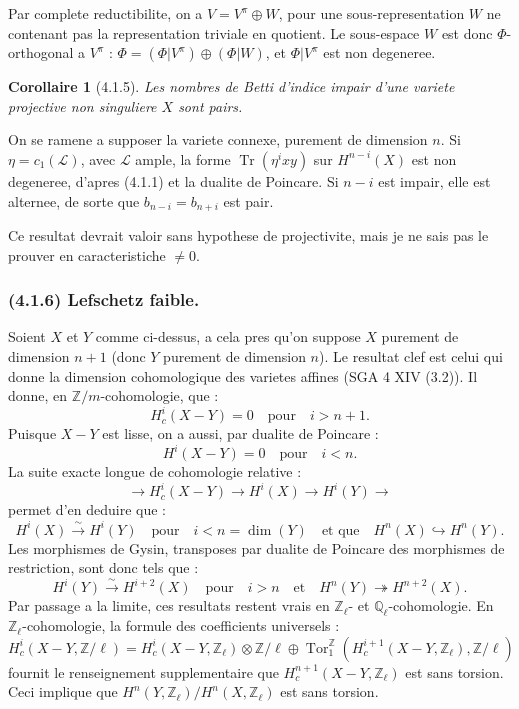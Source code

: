 \documentclass[12pt,a4paper]{article}
\theoremstyle{plain}
\newtheorem{corollary}[theorem]{Corollaire}
\theoremstyle{definition}
\theoremstyle{remark}
\DeclareMathOperator{\Tor}{Tor}
\DeclareMathOperator{\Tr}{Tr}
\newcommand{\bbZ}{\mathbb{Z}}
\newcommand{\scrL}{\mathscr{L}}
\newcommand{\Zl}{\mathbb{Z}_\ell}
\newcommand{\Ql}{\mathbb{Q}_\ell}
\begin{document}
Par complete reductibilite, on a $V = V^\pi \oplus W$, pour une sous-representation $W$ ne contenant pas la representation triviale en quotient. Le sous-espace $W$ est donc $\Phi$-orthogonal a $V^\pi$ : $\Phi = (\Phi|V^\pi) \oplus (\Phi|W)$, et $\Phi|V^\pi$ est non degeneree.

\begin{corollary}[4.1.5]
Les nombres de Betti d'indice impair d'une variete projective non singuliere $X$ sont pairs.
\end{corollary}

On se ramene a supposer la variete connexe, purement de dimension $n$. Si $\eta = c_1(\scrL)$, avec $\scrL$ ample, la forme $\Tr(\eta^i xy)$ sur $H^{n-i}(X)$ est non degeneree, d'apres (4.1.1) et la dualite de Poincare. Si $n-i$ est impair, elle est alternee, de sorte que $b_{n-i} = b_{n+i}$ est pair.

Ce resultat devrait valoir sans hypothese de projectivite, mais je ne sais pas le prouver en caracteristiche $\neq 0$.

\subsubsection*{\textup{(4.1.6)} Lefschetz faible.}

Soient $X$ et $Y$ comme ci-dessus, a cela pres qu'on suppose $X$ purement de dimension $n+1$ (donc $Y$ purement de dimension $n$). Le resultat clef est celui qui donne la dimension cohomologique des varietes affines (SGA 4 XIV (3.2)). Il donne, en $\bbZ/m$-cohomologie, que :
\[
H^i_c(X - Y) = 0 \quad \text{pour} \quad i > n+1.
\]
Puisque $X - Y$ est lisse, on a aussi, par dualite de Poincare :
\[
H^i(X - Y) = 0 \quad \text{pour} \quad i < n.
\]
La suite exacte longue de cohomologie relative :
\[
\to H^i_c(X - Y) \to H^i(X) \to H^i(Y) \to
\]
permet d'en deduire que :
\[
H^i(X) \xrightarrow{\sim} H^i(Y) \quad \text{pour} \quad i < n = \dim(Y) \quad \text{et que} \quad H^n(X) \hookrightarrow H^n(Y).
\]
Les morphismes de Gysin, transposes par dualite de Poincare des morphismes de restriction, sont donc tels que :
\[
H^i(Y) \xrightarrow{\sim} H^{i+2}(X) \quad \text{pour} \quad i > n \quad \text{et} \quad H^n(Y) \twoheadrightarrow H^{n+2}(X).
\]
Par passage a la limite, ces resultats restent vrais en $\Zl$- et $\Ql$-cohomologie. En $\Zl$-cohomologie, la formule des coefficients universels :
\[
H^i_c(X - Y, \bbZ/\ell) = H^i_c(X - Y, \Zl) \otimes \bbZ/\ell \oplus \Tor^{\bbZ}_1(H^{i+1}_c(X - Y, \Zl), \bbZ/\ell)
\]
fournit le renseignement supplementaire que $H^{n+1}_c(X - Y, \Zl)$ est sans torsion. Ceci implique que $H^n(Y, \Zl) / H^n(X, \Zl)$ est sans torsion.
\end{document}
